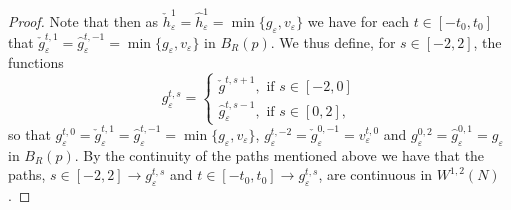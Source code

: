 \documentclass[11pt]{article}
\begin{document}
\begin{proof}
Note that then as $\check{h}^1_\varepsilon = \hat{h}^1_\varepsilon = \min\{g_\varepsilon,v_\varepsilon\}$ we have for each $t \in [-t_0,t_0]$ that $\check{g}^{t,1}_\varepsilon = \hat{g}^{t,-1}_\varepsilon = \min\{g_\varepsilon,v_\varepsilon\}$ in $B_R(p)$. We thus define, for $s \in [-2,2]$, the functions
\begin{equation*}
    g^{t,s}_\varepsilon = 
    \begin{cases}
    \check{g}^{t,s+1}, \text{ if } s \in [-2,0]\\
    \hat{g}^{t,s-1}_\varepsilon, \text{ if } s \in [0,2],
    \end{cases}
\end{equation*}
so that $g^{t,0}_\varepsilon = \check{g}^{t,1}_\varepsilon = \hat{g}^{t,-1}_\varepsilon = \min\{g_\varepsilon,v_\varepsilon\}$, $g^{t,-2}_\varepsilon = \check{g}^{0,-1}_\varepsilon = v^{t,0}_\varepsilon$ and  $g^{0,2}_\varepsilon = \hat{g}^{0,1}_\varepsilon = g_\varepsilon$ in $B_R(p)$. By the continuity of the paths mentioned above we have that the paths, $s \in [-2,2] \rightarrow g^{t,s}_\varepsilon$ and $t \in [-t_0,t_0] \rightarrow g^{t,s}_\varepsilon$, are continuous in $W^{1,2}(N)$.

\bigskip


\end{proof}
\end{document}
